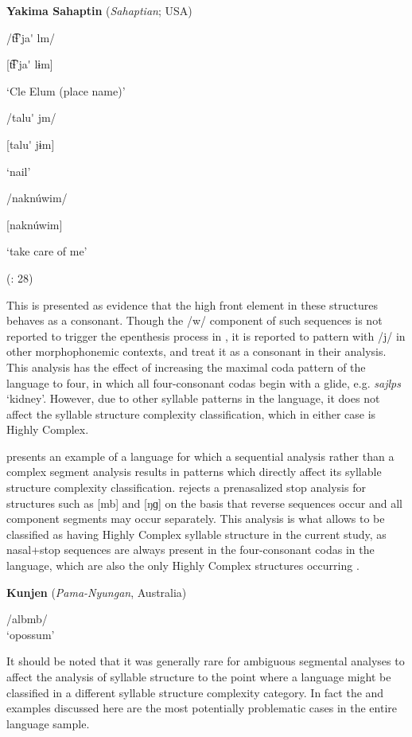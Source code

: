\ea\label{ex:4.7}
  \textbf{Yakima Sahaptin} (\textit{Sahaptian}; USA)

\ea  /t͡ɬ’ja\'{} lm/

  [t͡ɬ’ja\'{} lɨm]

  ‘Cle Elum (place name)’

\ex  /talu\'{} jm/

  [talu\'{} jɨm]

  ‘nail’

\ex  /naknúwim/

  [naknúwim]

  ‘take care of me’

(\citealt{HargusBeavert2006}: 28)
\z
\z

This is presented as evidence that the high front element in these structures behaves as a consonant. Though the /w/ component of such sequences is not reported to trigger the epenthesis process in , it is reported to pattern with /j/ in other morphophonemic contexts, and \citet{HargusBeavert2006} treat it as a consonant in their analysis. This analysis has the effect of increasing the maximal coda pattern of the language to four, in which all four-consonant codas begin with a glide, e.g. \textit{sajlps} ‘kidney’. However, due to other syllable patterns in the language, it does not affect the syllable structure complexity classification, which in either case is Highly Complex.

   presents an example of a language for which a sequential analysis rather than a complex segment analysis results in patterns which directly affect its syllable structure complexity classification. \citet[34]{Sommer1969}  rejects a prenasalized stop analysis for structures such as [mb] and [ŋɡ] on the basis that reverse sequences occur and all component segments may occur separately. This analysis is what allows  to be classified as having Highly Complex syllable structure in the current study, as nasal+stop sequences are always present in the four-consonant codas in the language, which are also the only Highly Complex structures occurring .

\ea\label{ex:4.8}
   \textbf{Kunjen} (\textit{Pama-Nyungan}, Australia)

/albmb/\\
\glt ‘opossum’
\citep[33]{Sommer1969}
\z

  It should be noted that it was generally rare for ambiguous segmental analyses to affect the analysis of syllable structure to the point where a language might be classified in a different syllable structure complexity category. In fact the  and  examples discussed here are the most potentially problematic cases in the entire language sample.

